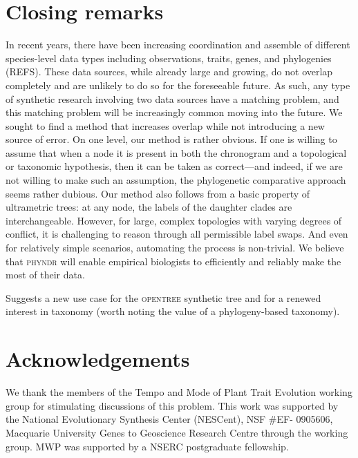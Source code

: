 \documentclass[a4paper,11pt]{article}
\begin{document}
\section{Closing remarks}

In recent years, there have been increasing coordination and assemble of different species-level data types including observations, traits, genes, and phylogenies (REFS).  These data sources, while already large and growing, do not overlap completely and are unlikely to do so for the foreseeable future.  As such, any type of synthetic research involving two data sources have a matching problem, and this matching problem will be increasingly common moving into the future.  We sought to find a method that increases overlap while not introducing a new source of error.  On one level, our method is rather obvious. If one is willing to assume that when a node it is present in both the chronogram and a topological or taxonomic hypothesis, then it can be taken as correct---and indeed, if we are not willing to make such an assumption, the phylogenetic comparative approach seems rather dubious.  Our method also follows from a basic property of ultrametric trees: at any node, the labels of the daughter clades are interchangeable. However, for large, complex topologies with varying degrees of conflict, it is challenging to reason through all permissible label swaps. And even for relatively simple scenarios, automating the process is non-trivial. We believe that \textsc{phyndr} will enable empirical biologists to efficiently and reliably make the most of their data.

Suggests a new use case for the \textsc{opentree} synthetic tree \citep{OpenTree} and for a renewed interest in taxonomy (worth noting the value of a phylogeny-based taxonomy).




\section{Acknowledgements}
We thank the members of the Tempo and Mode of Plant Trait
Evolution working group for stimulating discussions of this problem. This work was supported by the National Evolutionary Synthesis Center
(NESCent), NSF \#EF- 0905606, Macquarie University Genes to Geoscience
Research Centre through the working group. MWP was supported by a NSERC postgraduate fellowship.

\clearpage


\end{document}
